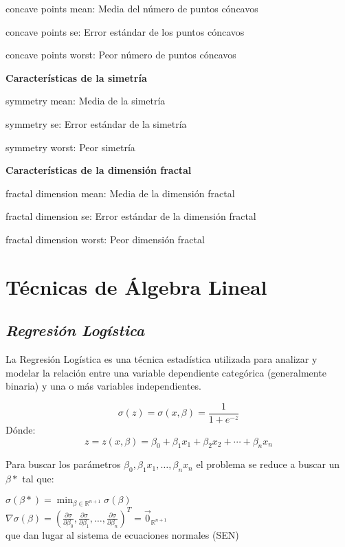 \documentclass[a4paper,10pt,twocolumn]{article}
\begin{document}
concave points mean: Media del número de puntos cóncavos

concave points se: Error estándar de los puntos cóncavos

concave points worst: Peor número de puntos cóncavos

\textbf{Características de la simetría}

symmetry mean: Media de la simetría

symmetry se: Error estándar de la simetría

symmetry worst: Peor simetría

\textbf{Características de la dimensión fractal}

fractal dimension mean: Media de la dimensión fractal

fractal dimension se: Error estándar de la dimensión fractal

fractal dimension worst: Peor dimensión fractal

\section{Técnicas de Álgebra Lineal}
\subsection{\textbf{\textit{Regresión Logística}}}

La Regresión Logística es una técnica estadística utilizada para analizar y modelar la relación entre una variable dependiente categórica (generalmente binaria) y una o más variables independientes.

\[
\sigma(z) =\sigma(x,\beta)= \frac{1}{1 + e^{-z}}
\]
Dónde:
\[
z = z(x,\beta)= \beta_0 + \beta_1 x_1 + \beta_2 x_2 + \cdots + \beta_n x_n 
\]

Para buscar los parámetros  $\beta_0,\beta_1x_1,\dots,\beta_nx_n$ el problema se  reduce a buscar un $\beta*$ tal que:

$\sigma(\beta*) = \min_{\beta \in \mathbb{R}^{n+1}} \sigma(\beta)$\\

$ \nabla \sigma(\beta) =(  
\frac{\partial \sigma}{\partial \beta_0}, 
\frac{\partial \sigma}{\partial \beta_1},
\hdots ,
\frac{\partial \sigma}{\partial \beta_n} 
)^T = \overset{\rightarrow}{0}_{\mathbb{R}^{n+1}}$\\

 que dan lugar al sistema de ecuaciones normales (SEN)\\
 
\end{document}
